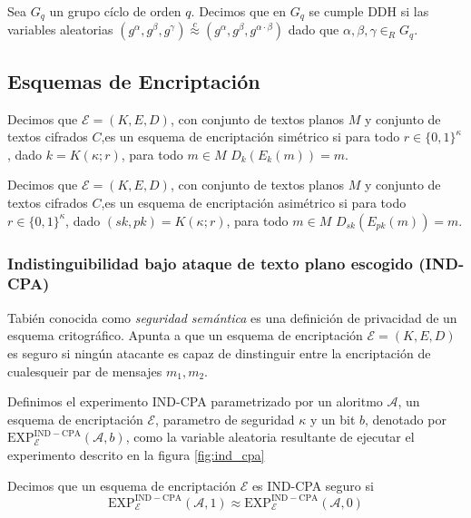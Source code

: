 \begin{definicion}[DDH]
Sea $G_q$ un grupo cíclo de orden $q$. Decimos que en $G_q$ se cumple DDH
si las variables aleatorias $(g^\alpha, g^\beta, g^\gamma) \overset{c}{\approx}
(g^\alpha, g^\beta, g^{\alpha \cdot \beta})$ dado que $\alpha, \beta, \gamma \in_R G_q$.
\end{definicion}

\subsection{Esquemas de Encriptación}
Decimos que $\mathcal{E} = (K, E, D)$, con conjunto de textos planos $M$ y conjunto de textos
cifrados $C$,es un esquema de encriptación simétrico si para todo
$r \in \{0, 1\}^\kappa$, dado $k = K(\kappa; r)$, para todo $m\in M$ $D_k(E_k(m))=m$.

Decimos que $\mathcal{E} = (K, E, D)$, con conjunto de textos planos $M$ y conjunto de textos
cifrados $C$,es un esquema de encriptación asimétrico si para todo
$r \in \{0, 1\}^\kappa$, dado $(sk, pk) = K(\kappa; r)$, para todo $m\in M$ $D_{sk}(E_{pk}(m))=m$.


\subsubsection{Indistinguibilidad bajo ataque de texto plano escogido (IND-CPA)}
Tabién conocida como \textit{seguridad semántica} es una definición de privacidad de un esquema
critográfico. Apunta a que un esquema de encriptación $\mathcal{E} = (K, E, D)$ es seguro si ningún atacante es capaz de
dinstinguir entre la encriptación de cualesqueir par de mensajes $m_1, m_2$.


\begin{definicion}
Definimos el experimento IND-CPA parametrizado por un aloritmo $\mathcal{A}$,
un esquema de encriptación $\mathcal{E}$, parametro de seguridad $\kappa$ y
un bit $b$, denotado por $\mathrm{EXP}^\mathrm{IND-CPA}_\mathcal{E}(\mathcal{A}, b)$,
como la variable aleatoria resultante de
ejecutar el experimento descrito en la figura \ref{fig:ind_cpa}
\end{definicion}


\begin{definicion}
Decimos que un esquema de encriptación $\mathcal{E}$ es IND-CPA seguro si
$$\mathrm{EXP}^\mathrm{IND-CPA}_\mathcal{E}(\mathcal{A}, 1) \approx
\mathrm{EXP}^\mathrm{IND-CPA}_\mathcal{E}(\mathcal{A}, 0)$$
\end{definicion}


